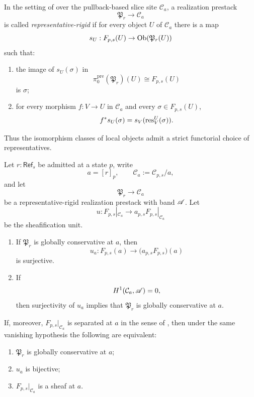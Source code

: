 \begin{definition}\label{def:representative-rigid-lift}
In the setting of  over the pullback-based slice site $\mathcal C_a$, a realization prestack
\[
\mathfrak P_r\to \mathcal C_a
\]
is called \emph{representative-rigid} if for every object $U$ of $\mathcal C_a$ there is a map
\[
s_U:F_{p,s}(U)\to \mathrm{Ob}(\mathfrak P_r(U))
\]
such that:
\begin{enumerate}[label=(\roman*),nosep]
\item the image of $s_U(\sigma)$ in
\[
\pi_0^{\mathrm{pre}}(\mathfrak P_r)(U)\cong F_{p,s}(U)
\]
is $\sigma$;
\item for every morphism $f:V\to U$ in $\mathcal C_a$ and every $\sigma\in F_{p,s}(U)$,
\[
f^*s_U(\sigma)=s_V(\mathrm{res}_V^U(\sigma)).
\]
\end{enumerate}
Thus the isomorphism classes of local objects admit a strict functorial choice of representatives.
\end{definition}

\begin{theorem}\label{thm:canonical-lift-rigidity}
Let $r:\mathsf{Ref}_s$ be admitted at a state $p$, write
\[
a=[r]_p,
\qquad
\mathcal C_a:=\mathcal C_{p,s}/a,
\]
and let
\[
\mathfrak P_r\to \mathcal C_a
\]
be a representative-rigid realization prestack with band $\mathscr{A}$. Let
\[
u:F_{p,s}|_{\mathcal C_a}\longrightarrow a_{p,s}F_{p,s}|_{\mathcal C_a}
\]
be the sheafification unit.
\begin{enumerate}[label=(\roman*),nosep]
\item If $\mathfrak P_r$ is globally conservative at $a$, then
\[
u_a:F_{p,s}(a)\to \bigl(a_{p,s}F_{p,s}\bigr)(a)
\]
is surjective.
\item If
\[
H^1(\mathcal C_a,\mathscr{A})=0,
\]
then surjectivity of $u_a$ implies that $\mathfrak P_r$ is globally conservative at $a$.
\end{enumerate}
If, moreover, $F_{p,s}|_{\mathcal C_a}$ is separated at $a$ in the sense of , then under the same vanishing hypothesis the following are equivalent:
\begin{enumerate}[label=(\alph*),nosep]
\item $\mathfrak P_r$ is globally conservative at $a$;
\item $u_a$ is bijective;
\item $F_{p,s}|_{\mathcal C_a}$ is a sheaf at $a$.
\end{enumerate}
\end{theorem}

